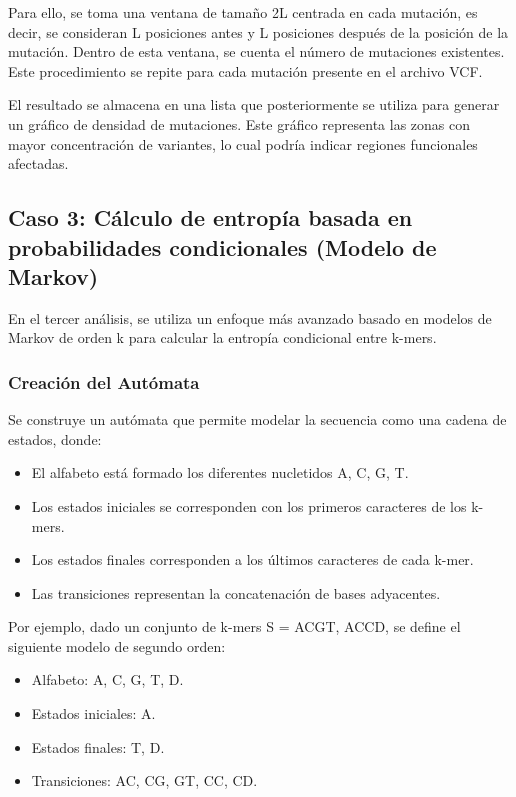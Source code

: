\documentclass[11pt,spanish,listoffigures,listoftables]{tfgetsinf}
\begin{document}
Para ello, se toma una ventana de tamaño 2L centrada en cada mutación, es decir, se consideran L posiciones antes y L posiciones después de la posición de la mutación. Dentro de esta ventana, se cuenta el número de mutaciones existentes. Este procedimiento se repite para cada mutación presente en el archivo \ac{VCF}.

El resultado se almacena en una lista que posteriormente se utiliza para generar un gráfico de densidad de mutaciones. Este gráfico representa las zonas con mayor concentración de variantes, lo cual podría indicar regiones funcionales afectadas.


\subsection{Caso 3: Cálculo de entropía basada en probabilidades condicionales (Modelo de Markov)}

En el tercer análisis, se utiliza un enfoque más avanzado basado en modelos de Markov de orden k para calcular la entropía condicional entre k-mers.

\subsubsection{Creación del Autómata}

Se construye un autómata que permite modelar la secuencia como una cadena de
estados, donde:

\begin{itemize}
   \item El alfabeto está formado los diferentes nucletidos {A, C, G, T}.
   \item Los estados iniciales se corresponden con los primeros caracteres de los k-mers.
   \item Los estados finales corresponden a los últimos caracteres de cada k-mer.
   \item Las transiciones representan la concatenación de bases adyacentes.
\end{itemize}


Por ejemplo, dado un conjunto de k-mers S = ACGT, ACCD, se define el siguiente modelo de segundo orden:

\begin{itemize}
   \item Alfabeto: {A, C, G, T, D}.
   \item Estados iniciales: {A}.
   \item Estados finales: {T, D}.
   \item Transiciones: {AC, CG, GT, CC, CD}.
\end{itemize}
\end{document}
